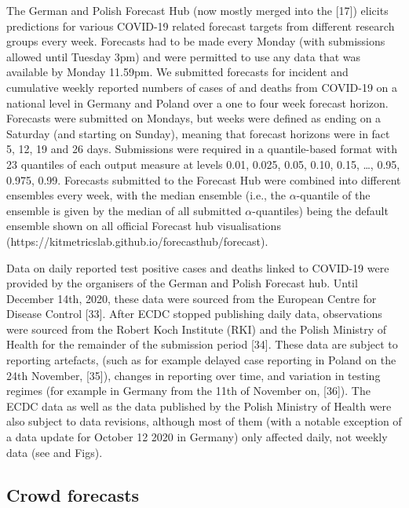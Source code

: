 \documentclass[10pt,letterpaper]{article}
\begin{document}
The German and Polish Forecast Hub (now mostly merged into the {[}17{]})
elicits predictions for various COVID-19 related forecast targets from
different research groups every week. Forecasts had to be made every
Monday (with submissions allowed until Tuesday 3pm) and were permitted
to use any data that was available by Monday 11.59pm. We submitted
forecasts for incident and cumulative weekly reported numbers of cases
of and deaths from COVID-19 on a national level in Germany and Poland
over a one to four week forecast horizon. Forecasts were submitted on
Mondays, but weeks were defined as ending on a Saturday (and starting on
Sunday), meaning that forecast horizons were in fact 5, 12, 19 and 26
days. Submissions were required in a quantile-based format with 23
quantiles of each output measure at levels 0.01, 0.025, 0.05, 0.10,
0.15, \ldots, 0.95, 0.975, 0.99. Forecasts submitted to the Forecast Hub
were combined into different ensembles every week, with the median
ensemble (i.e., the \(\alpha\)-quantile of the ensemble is given by the
median of all submitted \(\alpha\)-quantiles) being the default ensemble
shown on all official Forecast hub visualisations
(https://kitmetricslab.github.io/forecasthub/forecast).

Data on daily reported test positive cases and deaths linked to COVID-19
were provided by the organisers of the German and Polish Forecast hub.
Until December 14th, 2020, these data were sourced from the European
Centre for Disease Control {[}33{]}. After ECDC stopped publishing daily
data, observations were sourced from the Robert Koch Institute (RKI) and
the Polish Ministry of Health for the remainder of the submission period
{[}34{]}. These data are subject to reporting artefacts, (such as for
example delayed case reporting in Poland on the 24th November,
{[}35{]}), changes in reporting over time, and variation in testing
regimes (for example in Germany from the 11th of November on, {[}36{]}).
The ECDC data as well as the data published by the Polish Ministry of
Health were also subject to data revisions, although most of them (with
a notable exception of a data update for October 12 2020 in Germany)
only affected daily, not weekly data (see
 and 
Figs).

\hypertarget{crowd-forecasts}{%
\subsection{Crowd forecasts}\label{crowd-forecasts}}
\end{document}
